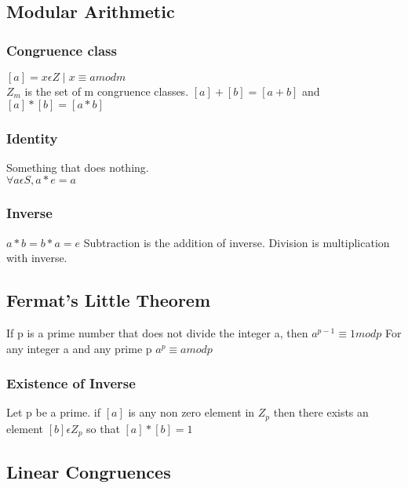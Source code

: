 \documentclass[12pt]{article}
\begin{document}
\subsection{Modular Arithmetic}
\subsubsection{Congruence class}
$[a]={x\epsilon Z\mid x\equiv a mod m}$
\\
$Z_m$ is the set of m congruence classes. $[a]+[b]=[a+b]$ and $[a]*[b]=[a*b]$
\subsubsection{Identity}
Something that does nothing. \\ $\forall a \epsilon S, a * e=a$
\subsubsection{Inverse}
$a*b=b*a=e$
Subtraction is the addition of inverse.
Division is multiplication with inverse.
\subsection{Fermat's Little Theorem}
If p is a prime number that does not divide the integer a, then $a^{p-1}
\equiv 1 mod p$
For any integer a and any prime p $a^p\equiv a mod p$
\subsubsection{Existence of Inverse}
Let p be a prime. if $[a]$ is any non zero element in $Z_p$ then there exists an
element $[b]\epsilon Z_p$ so that $[a]*[b]=1$
\subsection{Linear Congruences}
\end{document}
